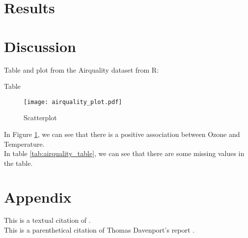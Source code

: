 \documentclass[12pt]{article}
\begin{document}
\section{Results}
\label{sec:resu}



\section{Discussion}
\label{sec:disc}

Table and plot from the Airquality dataset from R:

\begin{table}[htbp]
    \centering
    \caption{Table}
    \label{tab:airquality_table}
\end{table}

\begin{figure}[htbp]
    \centering
    \texttt{[image: airquality\_plot.pdf]}
    \caption{Scatterplot}
    \label{fig:airquality_plot}
\end{figure}

In Figure \ref{fig:airquality_plot}, we can see that there is a positive association between Ozone and Temperature.
\\
In table \ref{tab:airquality_table}, we can see that there are some missing values in the table. 

\section{Appendix}
\label{sec:appe}

This is a textual citation of \citet{Fan2014}.\\
This is a parenthetical citation of Thomas Davenport's report \citep{Davenport2012}.



\end{document}
